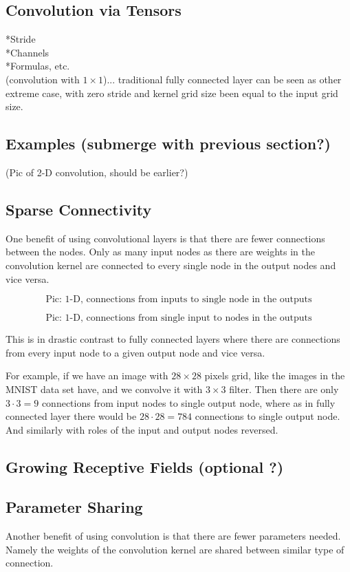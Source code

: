 \documentclass[]{article}
\begin{document}
\subsection{Convolution via Tensors}
*Stride\\
*Channels\\
*Formulas, etc.\\
(convolution with $1\times 1$)... traditional fully connected layer can be seen
as other extreme case, with zero stride and kernel grid size been equal to the
input grid size.

\subsection{Examples (submerge with previous section?)}
(Pic of 2-D convolution, should be earlier?)

\subsection{Sparse Connectivity}
One benefit of using convolutional layers is that there are fewer connections
between the nodes. Only as many input nodes as there are weights in the
convolution kernel are connected to every single node in the output nodes and
vice versa.

\[
\text{Pic: 1-D, connections from inputs to single node in the outputs}
\]

\[
\text{Pic: 1-D, connections from single input to nodes in the outputs}
\]

This is in drastic contrast to fully connected layers where there are connections
from every input node to a given output node and vice versa.

For example, if we have an image with $28 \times 28$ pixels grid, like the images
in the MNIST data set have, and we convolve it with $3 \times 3$ filter. Then
there are only $3 \cdot 3 = 9$ connections from input nodes to single output node,
where as in fully connected layer there would be $28 \cdot 28 = 784$ connections
to single output node. And similarly with roles of the input and output nodes reversed.

\subsection{Growing Receptive Fields (optional ?)}

\subsection{Parameter Sharing}
Another benefit of using convolution is that there are fewer parameters needed.
Namely the weights of the convolution kernel are shared between similar type of
connection.
\end{document}

